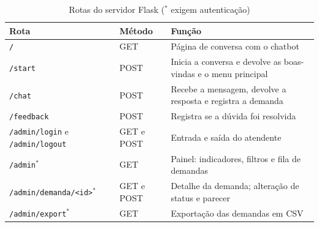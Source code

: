 \documentclass[10pt]{article}
\begin{document}
\begin{table}[H]
  \centering
  \begin{tabular}{|p{}|p{}|p{}|}
    \hline
    \textbf{Rota} & \textbf{Método} & \textbf{Função} \\ \hline
    \texttt{/} & GET & Página de conversa com o chatbot \\ \hline
    \texttt{/start} & POST & Inicia a conversa e devolve as boas-vindas e o menu
    principal \\ \hline
    \texttt{/chat} & POST & Recebe a mensagem, devolve a resposta e registra a
    demanda \\ \hline
    \texttt{/feedback} & POST & Registra se a dúvida foi resolvida \\ \hline
    \texttt{/admin/login} e \texttt{/admin/logout} & GET e POST & Entrada e
    saída do atendente \\ \hline
    \texttt{/admin}$^{*}$ & GET & Painel: indicadores, filtros e fila de demandas \\ \hline
    \texttt{/admin/demanda/<id>}$^{*}$ & GET e POST & Detalhe da demanda;
    alteração de status e parecer \\ \hline
    \texttt{/admin/export}$^{*}$ & GET & Exportação das demandas em CSV \\ \hline
  \end{tabular}
  \caption{Rotas do servidor Flask ($^{*}$ exigem autenticação)}
  \label{tab:rotas}
\end{table}
\end{document}
